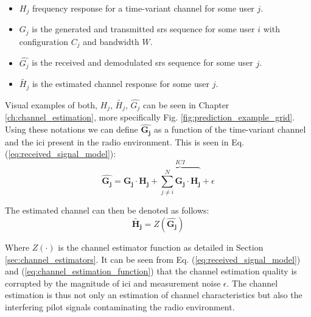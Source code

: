 \begin{itemize}
    \item $H_j$ frequency response for a time-variant channel for some user $j$.
    \item $G_j$ is the generated and transmitted \gls{srs} sequence for some user $i$ with configuration $C_j$ and bandwidth $W$.
    \item $\hat{G_j}$ is the received and demodulated \gls{srs} sequence for some user $j$.
    \item $\widetilde{H_j}$ is the estimated channel response for some user $j$.
\end{itemize}

Visual examples of both, $H_j$, $\widetilde{H_j}$, $\hat{G_j}$ can be seen in Chapter \ref{ch:channel_estimation}, more specifically Fig. \ref{fig:prediction_example_grid}. Using these notations we can define $\hat{\mathbf{G_j}}$ as a function of the time-variant channel and the \gls{ici} present in the radio environment. This is seen in Eq. (\ref{eq:received_signal_model}):
\begin{equation}\label{eq:received_signal_model}
    \hat{\mathbf{G_j}} = \mathbf{G_j} \cdot \mathbf{H_j} + \overbrace{\sum_{j \neq i}^N \mathbf{G_j} \cdot \mathbf{H_j}}^{ICI} + \epsilon
\end{equation}

The estimated channel can then be denoted as follows:
\begin{equation}\label{eq:channel_estimation_function}
    \widetilde{\mathbf{H_j}} = Z(\mathbf{\hat{G_j}}) 
\end{equation}

Where $Z(\cdot)$ is the channel estimator function as detailed in Section \ref{sec:channel_estimators}. It can be seen from Eq. (\ref{eq:received_signal_model}) and (\ref{eq:channel_estimation_function}) that the channel estimation quality is corrupted by the magnitude of \gls{ici} and measurement noise $\epsilon$. The channel estimation is thus not only an estimation of channel characteristics but also the interfering pilot signals contaminating the radio environment.

